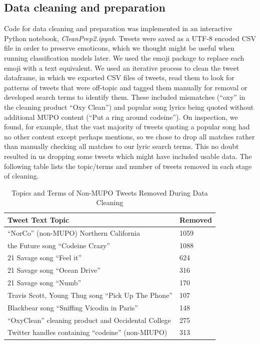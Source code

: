 \documentclass[sigconf]{acmart}
\begin{document}

\subsection{Data cleaning and preparation}

Code for data cleaning and preparation was implemented in an interactive 
Python notebook, \emph{CleanPrep2.ipynb}. Tweets were saved as a UTF-8 encoded 
CSV file in order to preserve emoticons, which we thought might be useful when 
running classification models later. We used the emoji package \cite{pkgRef3} 
to replace each emoji with a text equivalent. We used an iterative process to 
clean the tweet dataframe, in which we exported CSV files of tweets, read them 
to look for patterns of tweets that were off-topic and tagged them manually for 
removal or developed search terms to identify them. These included mismatches 
(``oxy'' in the cleaning product ``Oxy Clean'') and popular song lyrics being 
quoted without additional MUPO content (``Put a ring around codeine''). On 
inspection, we found, for example, that the vast majority of tweets quoting a 
popular song had no other content except perhaps mentions, so we chose to drop 
all matches rather than manually checking all matches to our lyric search terms. 
This no doubt resulted in us dropping some tweets which might have included 
usable data. The following table lists the topic/terms and number of tweets 
removed in each stage of cleaning.

\begin{table}[htb]
\centering
\caption{Topics and Terms of Non-MUPO Tweets Removed During Data Cleaning}
\label{t:mytable}
\begin{tabular*}{\columnwidth}{ll}
  \toprule
  Tweet Text Topic& Removed \\
  \midrule
  ``NorCo'' (non-MUPO) Northern California & 1059 \\
  the Future song ``Codeine Crazy''  & 1088 \\
  21 Savage song ``Feel it'' & 624 \\
  21 Savage song ``Ocean Drive''  & 316 \\
  21 Savage song ``Numb'' & 170 \\
  Travis Scott, Young Thug song ``Pick Up The Phone'' & 107 \\
  Blackbear song ``Sniffing Vicodin in Paris'' & 148 \\
  ``OxyClean'' cleaning product and Occidental College & 275 \\
  Twitter handles containing ``codeine'' (non-MIUPO) & 313 \\
  \bottomrule
\end{tabular*}
\end{table}
\end{document}
